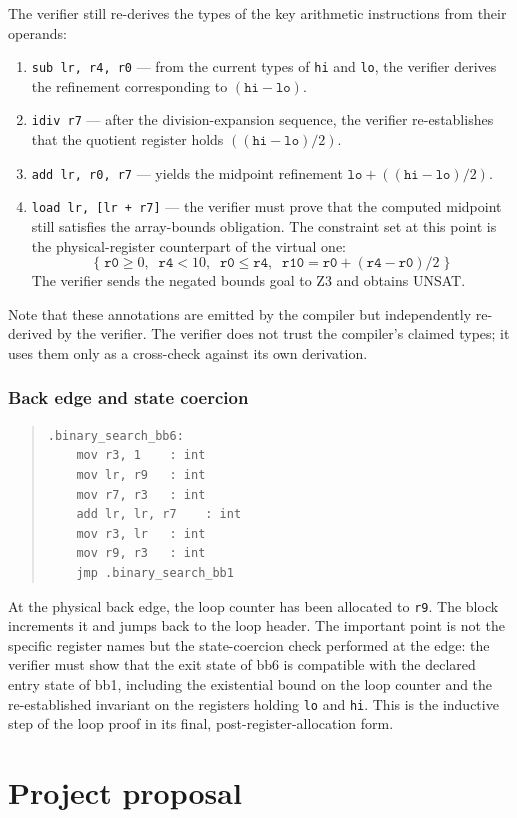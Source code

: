 The verifier still re-derives the types of the key arithmetic instructions from their operands:
\begin{enumerate}
  \item \texttt{sub lr, r4, r0} --- from the current types of \texttt{hi} and \texttt{lo}, the verifier derives the refinement corresponding to $(\texttt{hi} - \texttt{lo})$.
  \item \texttt{idiv r7} --- after the division-expansion sequence, the verifier re-establishes that the quotient register holds $((\texttt{hi} - \texttt{lo}) / 2)$.
  \item \texttt{add lr, r0, r7} --- yields the midpoint refinement $\texttt{lo} + ((\texttt{hi} - \texttt{lo}) / 2)$.
  \item \texttt{load lr, [lr + r7]} --- the verifier must prove that the computed midpoint still satisfies the array-bounds obligation. The constraint set at this point is the physical-register counterpart of the virtual one:
    \[
      \{\; \texttt{r0} \ge 0, \;\; \texttt{r4} < 10, \;\; \texttt{r0} \le \texttt{r4}, \;\; \texttt{r10} = \texttt{r0} + (\texttt{r4} - \texttt{r0})/2 \;\}
    \]
    The verifier sends the negated bounds goal to Z3 and obtains UNSAT.
\end{enumerate}
%
Note that these annotations are emitted by the compiler but independently re-derived by the verifier. The verifier does not trust the compiler's claimed types; it uses them only as a cross-check against its own derivation.
%
\subsection{Back edge and state coercion}
%
\begin{quote}
\begin{verbatim}
.binary_search_bb6:
    mov r3, 1    : int
    mov lr, r9   : int
    mov r7, r3   : int
    add lr, lr, r7    : int
    mov r3, lr   : int
    mov r9, r3   : int
    jmp .binary_search_bb1
\end{verbatim}
\end{quote}
%
At the physical back edge, the loop counter has been allocated to \texttt{r9}. The block increments it and jumps back to the loop header. The important point is not the specific register names but the state-coercion check performed at the edge: the verifier must show that the exit state of bb6 is compatible with the declared entry state of bb1, including the existential bound on the loop counter and the re-established invariant on the registers holding \texttt{lo} and \texttt{hi}. This is the inductive step of the loop proof in its final, post-register-allocation form.

\chapter{Project proposal}


